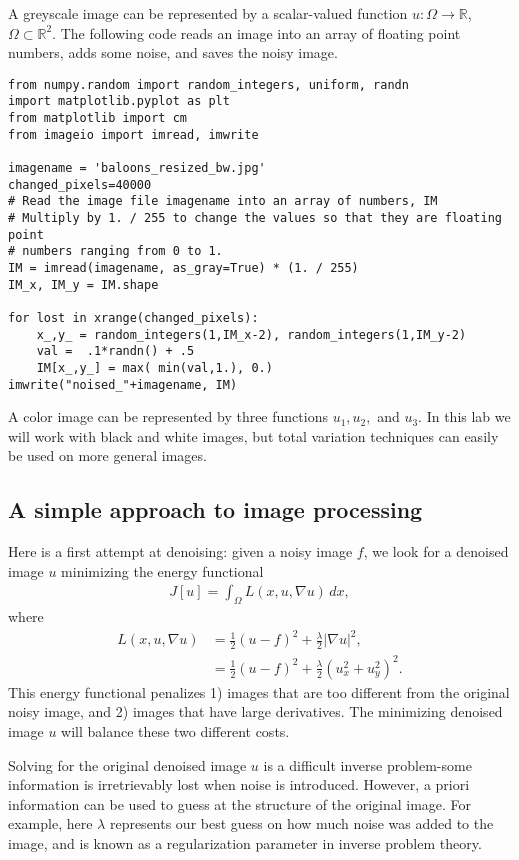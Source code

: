 A greyscale image can be represented by a scalar-valued function $u:\Omega \to \mathbb{R}$, $\Omega \subset \mathbb{R}^2$. The following code reads an image into an array of floating point numbers, adds some noise, and saves the noisy image.
\begin{lstlisting}
from numpy.random import random_integers, uniform, randn
import matplotlib.pyplot as plt
from matplotlib import cm
from imageio import imread, imwrite

imagename = 'baloons_resized_bw.jpg'
changed_pixels=40000
# Read the image file imagename into an array of numbers, IM
# Multiply by 1. / 255 to change the values so that they are floating point
# numbers ranging from 0 to 1.
IM = imread(imagename, as_gray=True) * (1. / 255)
IM_x, IM_y = IM.shape

for lost in xrange(changed_pixels):
    x_,y_ = random_integers(1,IM_x-2), random_integers(1,IM_y-2)
    val =  .1*randn() + .5
    IM[x_,y_] = max( min(val,1.), 0.)
imwrite("noised_"+imagename, IM)
\end{lstlisting}
A color image can be represented by three functions $u_1, u_2,$ and $u_3$. In this lab we will work with black and white images, but total variation techniques can easily be used on more general images.

\subsection*{A simple approach to image processing}
Here is a first attempt at denoising: given a noisy image $f$, we look for a denoised image $u$ minimizing the energy functional
\begin{align}
J[u] = \int_{\Omega} L(x,u,\nabla u) \, dx, \label{tv_images:diffusion}
\end{align}
where
\begin{align*}
L(x,u,\nabla u) &= \frac{1}{2}(u-f)^2 + \frac{\lambda}{2} | \nabla u|^2,\\
&= \frac{1}{2}(u-f)^2 + \frac{\lambda}{2} (u_x^2 + u_y^2)^2.
\end{align*}
This energy functional penalizes 1) images that are too different from the original noisy image, and 2) images that have large derivatives. The minimizing denoised image $u$ will balance these two different costs.

Solving for the original denoised image $u$ is a difficult inverse problem-some information is irretrievably lost when noise is introduced. However, a priori information can be used to guess at the structure of the original image.  For example, here $\lambda$ represents our best guess on how much noise was added to the image, and is known as a regularization parameter in inverse problem theory.


